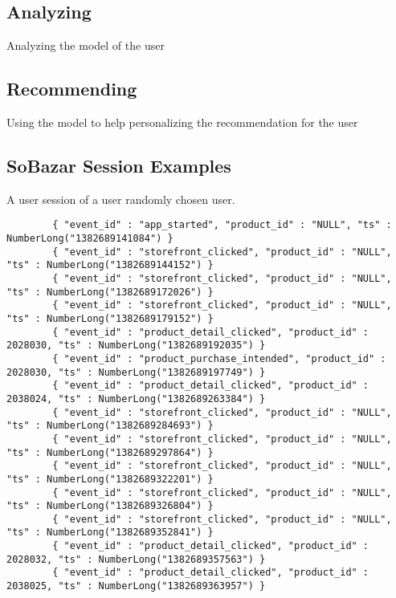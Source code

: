 \subsection{Analyzing}
    Analyzing the model of the user


\subsection{Recommending}
    Using the model to help personalizing the recommendation for the user


\subsection{SoBazar Session Examples} %
    \label{par:session_examples}
    A user session of a user randomly chosen user.
    \begin{lstlisting}
        { "event_id" : "app_started", "product_id" : "NULL", "ts" : NumberLong("1382689141084") }
        { "event_id" : "storefront_clicked", "product_id" : "NULL", "ts" : NumberLong("1382689144152") }
        { "event_id" : "storefront_clicked", "product_id" : "NULL", "ts" : NumberLong("1382689172026") }
        { "event_id" : "storefront_clicked", "product_id" : "NULL", "ts" : NumberLong("1382689179152") }
        { "event_id" : "product_detail_clicked", "product_id" : 2028030, "ts" : NumberLong("1382689192035") }
        { "event_id" : "product_purchase_intended", "product_id" : 2028030, "ts" : NumberLong("1382689197749") }
        { "event_id" : "product_detail_clicked", "product_id" : 2038024, "ts" : NumberLong("1382689263384") }
        { "event_id" : "storefront_clicked", "product_id" : "NULL", "ts" : NumberLong("1382689284693") }
        { "event_id" : "storefront_clicked", "product_id" : "NULL", "ts" : NumberLong("1382689297864") }
        { "event_id" : "storefront_clicked", "product_id" : "NULL", "ts" : NumberLong("1382689322201") }
        { "event_id" : "storefront_clicked", "product_id" : "NULL", "ts" : NumberLong("1382689326804") }
        { "event_id" : "storefront_clicked", "product_id" : "NULL", "ts" : NumberLong("1382689352841") }
        { "event_id" : "product_detail_clicked", "product_id" : 2028032, "ts" : NumberLong("1382689357563") }
        { "event_id" : "product_detail_clicked", "product_id" : 2038025, "ts" : NumberLong("1382689363957") }
    \end{lstlisting}


